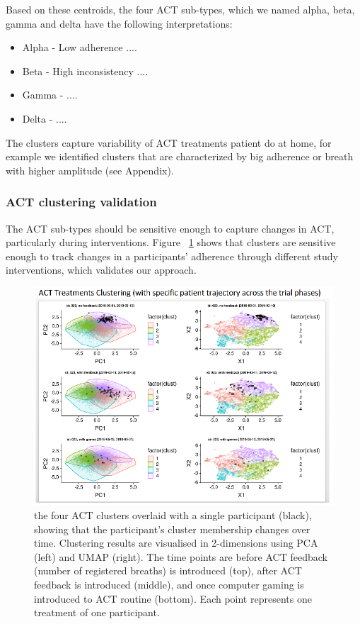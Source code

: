 \documentclass{article}
\begin{document}
 Based on these centroids, the four ACT sub-types, which we named alpha, beta, gamma and delta have the following interpretations: 

\begin{itemize}
\item Alpha - Low adherence  ....
\item Beta - High inconsistency ....
\item Gamma -  ....
\item Delta -  ....
\end{itemize}

The clusters capture variability of ACT treatments patient do at home, for example we identified clusters that are characterized by big adherence or breath with higher amplitude (see Appendix).

\subsubsection{ACT clustering validation}

The ACT sub-types should be sensitive enough to capture changes in ACT, particularly during interventions. Figure ~\ref{fig:act_res} shows that clusters are sensitive enough to track changes in a participants' adherence through different study interventions, which validates our approach.

\begin{figure}[!htb]
  \centering
  \includegraphics[]{fig_ACT_clust}
  \caption{the four ACT clusters overlaid with a single participant (black), showing that the participant’s cluster membership changes over time. Clustering results are visualised in 2-dimensions using PCA (left) and UMAP (right). The time points are before ACT feedback (number of registered breaths) is introduced (top), after ACT feedback is introduced (middle), and once computer gaming is introduced to ACT routine (bottom). Each point represents one treatment of one participant. }
  \label{fig:act_res}
\end{figure}
\end{document}
